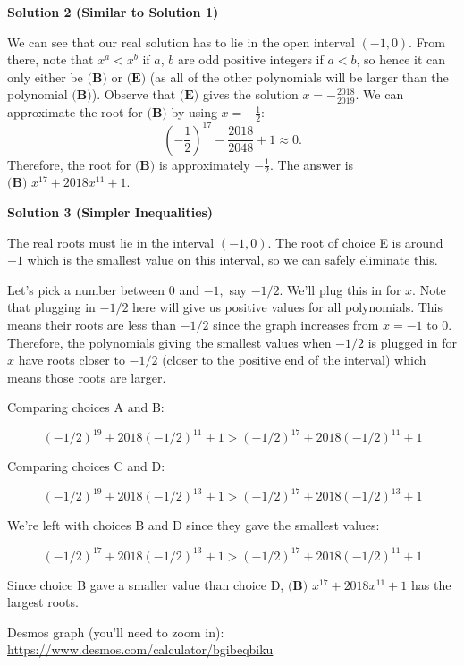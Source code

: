 \begin{enumerate}
 



\textbf{Solution 2 (Similar to Solution 1)}

We can see that our real solution has to lie in the open interval $(-1,0)$. From there, note that $x^a < x^b$ if $a$, $b$ are odd positive integers if $a<b$, so hence it can only either be $\textbf{(B)}$ or $\textbf{(E)}$ (as all of the other polynomials will be larger than the polynomial $\textbf{(B)}$). Observe that $\textbf{(E)}$ gives the solution $x=-\frac{2018}{2019}$. We can approximate the root for $\textbf{(B)}$ by using $x=-\frac 12$: 
 \[\left(-\frac{1}{2}\right)^{17} - \frac{2018}{2048} + 1 \approx 0.\] Therefore, the root for $\textbf{(B)}$ is approximately $-\frac 12$. The answer is $\boxed{\textbf{(B) }   x^{17}+2018x^{11}+1}$.

 



\textbf{Solution 3 (Simpler Inequalities)}

The real roots must lie in the interval $(-1, 0).$ The root of choice E is around $-1$ which is the smallest value on this interval, so we can safely eliminate this. 

 Let's pick a number between $0$ and $-1,$ say $-1/2.$ We'll plug this in for $x.$ Note that plugging in $-1/2$ here will give us positive values for all polynomials. This means their roots are less than $-1/2$ since the graph increases from $x = -1$ to $0.$ Therefore, the polynomials giving the smallest values when $-1/2$ is plugged in for $x$ have roots closer to $-1/2$ (closer to the positive end of the interval) which means those roots are larger.

 
Comparing choices A and B:

 
 \[(-1/2)^{19} + 2018(-1/2)^{11} + 1 > (-1/2)^{17} + 2018(-1/2)^{11} + 1\]

 Comparing choices C and D:

 
 \[(-1/2)^{19} + 2018(-1/2)^{13} + 1 > (-1/2)^{17} + 2018(-1/2)^{13} + 1\]

 
We're left with choices B and D since they gave the smallest values:

 
 \[(-1/2)^{17} + 2018(-1/2)^{13} + 1 > (-1/2)^{17} + 2018(-1/2)^{11} + 1\]

 
Since choice B gave a smaller value than choice D, $\boxed{\textbf{(B) } x^{17}+2018x^{11}+1}$ has the largest roots.

 Desmos graph (you’ll need to zoom in): \href{https://www.desmos.com/calculator/bgibeqbiku}{https://www.desmos.com/calculator/bgibeqbiku}


\end{enumerate}
